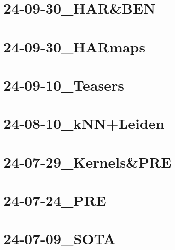 \documentclass[11pt]{article}
\begin{document}
\section{24-09-30\_HAR\&BEN}

\section{24-09-30\_HARmaps}

\section{24-09-10\_Teasers}

\section{24-08-10\_kNN+Leiden}

\section{24-07-29\_Kernels\&PRE}

\section{24-07-24\_PRE}

\section{24-07-09\_SOTA}


\printbibliography
\end{document}
